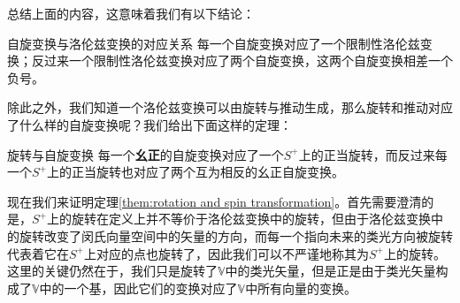 总结上面的内容，这意味着我们有以下结论：


\begin{them}[label={them:Spin and Lorentz transformation}]{自旋变换与洛伦兹变换的对应关系}
	每一个自旋变换对应了一个限制性洛伦兹变换；反过来一个限制性洛伦兹变换对应了两个自旋变换，这两个自旋变换相差一个负号。
\end{them}

除此之外，我们知道一个洛伦兹变换可以由旋转与推动生成，那么旋转和推动对应了什么样的自旋变换呢？我们给出下面这样的定理：

\begin{them}[label={them:rotation and spin transformation}]{旋转与自旋变换}
	每一个\textbf{幺正}的自旋变换对应了一个$S^{+}$上的正当旋转，而反过来每一个$S^{+}$上的正当旋转也对应了两个互为相反的幺正自旋变换。
\end{them}

现在我们来证明定理\ref{them:rotation and spin transformation}。首先需要澄清的是，$S^{+}$上的旋转在定义上并不等价于洛伦兹变换中的旋转，但由于洛伦兹变换中的旋转改变了闵氏向量空间中的矢量的方向，而每一个指向未来的类光方向被旋转代表着它在$S^{+}$上对应的点也旋转了，因此我们可以不严谨地称其为$S^{+}$上的旋转。这里的关键仍然在于，我们只是旋转了$\mathbb{V}$中的类光矢量，但是正是由于类光矢量构成了$\mathbb{V}$中的一个基，因此它们的变换对应了$\mathbb{V}$中所有向量的变换。

